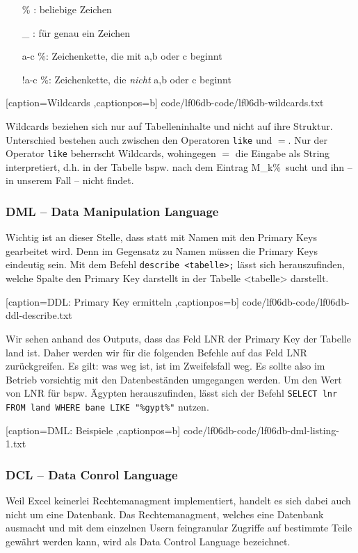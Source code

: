 \begin{itemize}
	\item [\%]: beliebige Zeichen
	\item [\_]: für genau ein Zeichen
	\item [a-c]\%: Zeichenkette, die mit a,b oder c beginnt  
	\item [!a-c]\%: Zeichenkette, die \emph{nicht} a,b oder c beginnt
\end{itemize}


	[caption={Wildcards}
	\label{lst:wildcards},captionpos=b]
	{code/lf06db-code/lf06db-wildcards.txt}

Wildcards beziehen sich nur auf Tabelleninhalte und nicht auf ihre Struktur. Unterschied bestehen auch zwischen den Operatoren \texttt{like} und $=$. Nur der Operator \texttt{like} beherrscht Wildcards, wohingegen $=$ die Eingabe als String interpretiert, d.h. in der Tabelle bspw. nach dem Eintrag \ql M\_k\%\qr\ sucht und ihn -- in unserem Fall -- nicht findet.

\subsubsection{DML -- Data Manipulation Language}

Wichtig ist an dieser Stelle, dass statt mit Namen mit den Primary Keys gearbeitet wird. Denn im Gegensatz zu Namen müssen die Primary Keys eindeutig sein. Mit dem Befehl \texttt{describe <tabelle>;} lässt sich herauszufinden, welche Spalte den Primary Key darstellt in der Tabelle <tabelle> darstellt.


	[caption={DDL: Primary Key ermitteln}
	\label{lst:ddl-describe},captionpos=b]
	{code/lf06db-code/lf06db-ddl-describe.txt}

Wir sehen anhand des Outputs, dass das Feld LNR der Primary Key der Tabelle land ist. Daher werden wir für die folgenden Befehle auf das Feld LNR zurückgreifen. Es gilt: was weg ist, ist im Zweifelsfall weg. Es sollte also im Betrieb vorsichtig mit den Datenbeständen umgegangen werden. Um den Wert von LNR für bspw. Ägypten herauszufinden, lässt sich der Befehl \verb+SELECT lnr FROM land WHERE bane LIKE "%gypt%"+ nutzen.	


	[caption={DML: Beispiele}
	\label{lst:dml-listing-1},captionpos=b]
	{code/lf06db-code/lf06db-dml-listing-1.txt}

\subsubsection{DCL -- Data Conrol Language}
Weil Excel keinerlei Rechtemanagment implementiert, handelt es sich dabei auch nicht um eine Datenbank. Das Rechtemanagment, welches eine Datenbank ausmacht und mit dem einzelnen Usern feingranular Zugriffe auf bestimmte Teile gewährt werden kann, wird als Data Control Language bezeichnet.


